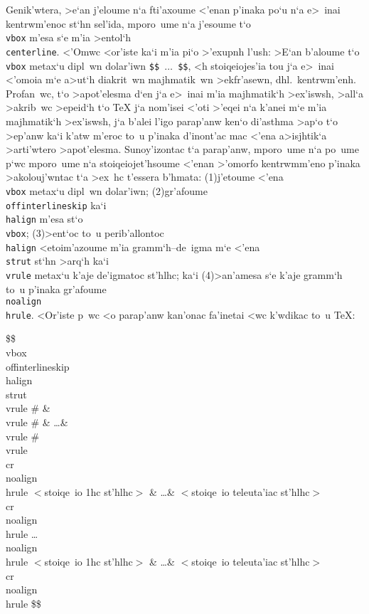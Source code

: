 Genik'wtera, >e`an j'eloume n`a fti'axoume <'enan p'inaka po`u n`a
e>~inai kentrwm'enoc st`hn sel'ida, mporo~ume n`a j'esoume t`o {\tt
\\vbox} m'esa s`e m'ia >entol`h {\tt\\centerline\lb\rb}\null.  <'Omwc
<or'iste ka`i m'ia pi`o >'exupnh l'ush: >E`an b'aloume t`o {\tt\\vbox}
metax`u dipl~wn dolar'iwn {\tt \$\$ $\ldots$ \$\$}, <h stoiqeiojes'ia
tou j`a e>~inai <'omoia m`e a>ut`h diakrit~wn majhmatik~wn >ekfr'asewn,
dhl.\ kentrwm'enh.  Profan~wc, t`o >apot'elesma d`en j`a e>~inai m'ia
majhmatik`h >ex'iswsh, >all`a >akrib~wc >epeid`h t`o {\rm\TeX} j`a
nom'isei <'oti >'eqei n`a k'anei m`e m'ia majhmatik`h >ex'iswsh, j`a
b'alei l'igo parap'anw ken`o di'asthma >ap`o t`o >ep'anw ka`i k'atw
m'eroc to~u p'inaka d'inont'ac mac <'ena a>isjhtik`a >arti'wtero
>apot'elesma. Sunoy'izontac t`a parap'anw, mporo~ume n`a po~ume p`wc
mporo~ume n`a stoiqeiojet'hsoume <'enan >'omorfo kentrwmm'eno p'inaka
>akolouj'wntac t`a >ex~hc t'essera b'hmata: (1)\NB{}j'e\-tou\-me <'ena
{\tt \\vbox} metax`u dipl~wn dolar'iwn; (2)\NB{}gr'afoume {\tt
\\offinterlineskip} ka`i {\tt\\halign} m'esa st`o {\tt \\vbox};
(3)\NB{}>ent`oc to~u perib'allontoc {\tt \\halign} <etoim'azoume m'ia
gramm`h--de~igma m`e <'ena {\tt \\strut} st`hn >arq`h ka`i {\tt\\vrule}
metax`u k'aje de'igmatoc st'hlhc; ka`i (4)\NB{}>an'amesa s`e k'aje
gramm`h to~u p'inaka gr'afoume {\tt \\noalign\lb\\hrule\rb}. <Or'iste
p~wc <o parap'anw kan'onac fa'inetai <wc k'wdikac to~u {\rm\TeX}:

\beginuser
\$\$\\vbox\lb
\\offinterlineskip
\\halign\lb
\\strut \\vrule \# \& \\vrule \# \& \dots \& \\vrule \# \\vrule \\cr
\\noalign\lb\\hrule\rb
$<${\tengs stoiqe~io 1hc st'hlhc\/}$>$ \& \dots \& %
$<${\tengs stoiqe~io teleuta'iac st'hlhc\/}$>$ \\cr
\\noalign\lb\\hrule\rb
\dots
\\noalign\lb\\hrule\rb
$<${\tengs stoiqe~io 1hc st'hlhc\/}$>$ \& \dots \& %
$<${\tengs stoiqe~io teleuta'iac st'hlhc\/}$>$ \\cr
\\noalign\lb\\hrule\rb
\rb
\rb\$\$
\enduser


